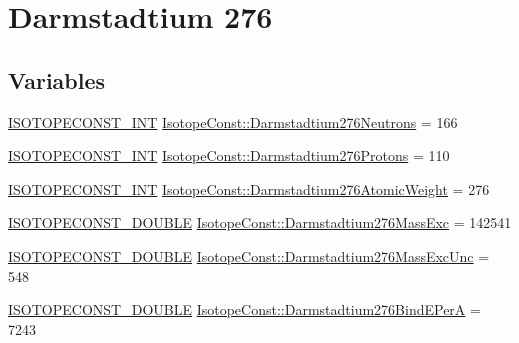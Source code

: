 \hypertarget{group___isotope_const-_darmstadtium-_ds276}{}\section{Darmstadtium 276}
\label{group___isotope_const-_darmstadtium-_ds276}
\subsection*{Variables}
\begin{DoxyCompactItemize}
\item 
\mbox{\hyperlink{group___isotope_const-_macros_ga5f18360b3e99483a35c32d789e62621c}{I\+S\+O\+T\+O\+P\+E\+C\+O\+N\+S\+T\+\_\+\+I\+NT}} \mbox{\hyperlink{group___isotope_const-_darmstadtium-_ds276_ga43988ecb7b1f4e6913c2fed5cb43d891}{Isotope\+Const\+::\+Darmstadtium276\+Neutrons}} = 166
\item 
\mbox{\hyperlink{group___isotope_const-_macros_ga5f18360b3e99483a35c32d789e62621c}{I\+S\+O\+T\+O\+P\+E\+C\+O\+N\+S\+T\+\_\+\+I\+NT}} \mbox{\hyperlink{group___isotope_const-_darmstadtium-_ds276_ga3259292937b0d3148627ae8c265e4048}{Isotope\+Const\+::\+Darmstadtium276\+Protons}} = 110
\item 
\mbox{\hyperlink{group___isotope_const-_macros_ga5f18360b3e99483a35c32d789e62621c}{I\+S\+O\+T\+O\+P\+E\+C\+O\+N\+S\+T\+\_\+\+I\+NT}} \mbox{\hyperlink{group___isotope_const-_darmstadtium-_ds276_ga52fdf8a83e9e145a94b65f3edf540abe}{Isotope\+Const\+::\+Darmstadtium276\+Atomic\+Weight}} = 276
\item 
\mbox{\hyperlink{group___isotope_const-_macros_ga8f45a7272ce02c0b4c65c44636ed719a}{I\+S\+O\+T\+O\+P\+E\+C\+O\+N\+S\+T\+\_\+\+D\+O\+U\+B\+LE}} \mbox{\hyperlink{group___isotope_const-_darmstadtium-_ds276_ga7c1b5e318caa1e0d24a7577b2046dac1}{Isotope\+Const\+::\+Darmstadtium276\+Mass\+Exc}} = 142541
\item 
\mbox{\hyperlink{group___isotope_const-_macros_ga8f45a7272ce02c0b4c65c44636ed719a}{I\+S\+O\+T\+O\+P\+E\+C\+O\+N\+S\+T\+\_\+\+D\+O\+U\+B\+LE}} \mbox{\hyperlink{group___isotope_const-_darmstadtium-_ds276_gaa82d6e3fd97aec49e4851a6a5ae0f102}{Isotope\+Const\+::\+Darmstadtium276\+Mass\+Exc\+Unc}} = 548
\item 
\mbox{\hyperlink{group___isotope_const-_macros_ga8f45a7272ce02c0b4c65c44636ed719a}{I\+S\+O\+T\+O\+P\+E\+C\+O\+N\+S\+T\+\_\+\+D\+O\+U\+B\+LE}} \mbox{\hyperlink{group___isotope_const-_darmstadtium-_ds276_gaaac24efcaca5672ff63538916edaf974}{Isotope\+Const\+::\+Darmstadtium276\+Bind\+E\+PerA}} = 7243

\end{DoxyCompactItemize}
